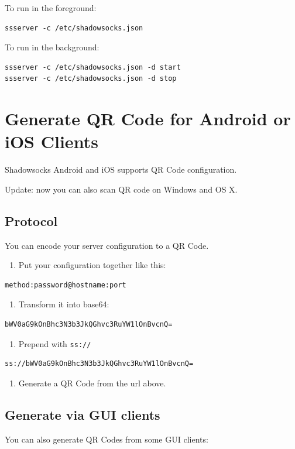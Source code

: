 \documentclass[11pt,a4paper]{sphinxmanual}
\begin{document}
To run in the foreground:
\begin{Verbatim}
ssserver -c /etc/shadowsocks.json
\end{Verbatim}


To run in the background:
\begin{Verbatim}
ssserver -c /etc/shadowsocks.json -d start
ssserver -c /etc/shadowsocks.json -d stop
\end{Verbatim}


\section{Generate QR Code for Android or iOS Clients}
\label{sec-5-2}
Shadowsocks Android and iOS supports QR Code configuration.

Update: now you can also scan QR code on Windows and OS X.

\subsection{Protocol}
\label{sec-5-2-1}
You can encode your server configuration to a QR Code.

\begin{enumerate}
\item Put your configuration together like this:
\end{enumerate}
\begin{Verbatim}
method:password@hostname:port
\end{Verbatim}

\begin{enumerate}
\item Transform it into base64:
\end{enumerate}
\begin{Verbatim}
bWV0aG9kOnBhc3N3b3JkQGhvc3RuYW1lOnBvcnQ=
\end{Verbatim}

\begin{enumerate}
\item Prepend with \verb~ss://~
\end{enumerate}
\begin{Verbatim}
ss://bWV0aG9kOnBhc3N3b3JkQGhvc3RuYW1lOnBvcnQ=
\end{Verbatim}

\begin{enumerate}
\item Generate a QR Code from the url above.
\end{enumerate}

\subsection{Generate via GUI clients}
\label{sec-5-2-2}
You can also generate QR Codes from some GUI clients:
\end{document}
